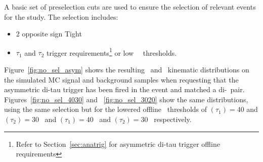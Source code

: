 	 A basic set of preselection cuts are used to ensure the selection of relevant events for the study. 
	 The selection includes:
	 \begin{itemize}
	 \item 2 opposite sign Tight \ltau\
	 \item $\tau_1$ and $\tau_2$ trigger requirements\footnote{Refer to Section~\ref{sec:anatrig} for asymmetric di-tau trigger offline requirements} or low \ltau\ \pt\ thresholds.
	 \end{itemize}
	
 	 Figure~\ref{fig:no_sel_asym} shows the resulting \ltau\ and  \met\ kinematic distributions on the simulated \ac{MC} signal and background samples when requesting that the asymmetric di-tau trigger has been fired in the event and matched a di-\ltau\ pair. 
 	 Figures~\ref{fig:no_sel_4030} and ~\ref{fig:no_sel_3020} show the same distributions, using the same selection but for the lowered offline \pt\ thresholds of \pt$(\tau_1)=40$ \gev and \pt$(\tau_2)=30$ \gev\, and  \pt$(\tau_1)=40$ \gev\ and \pt$(\tau_2)=30$ \gev\, respectively.
 	\NoSelectionAsymmetricTrigger
 	
	\NoSelectionFTTrigger
	
